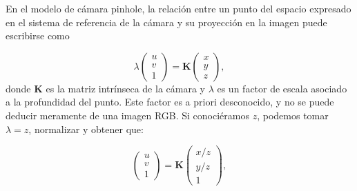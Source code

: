 En el modelo de cámara pinhole, la relación entre un punto del espacio expresado en el sistema de referencia de la cámara y su proyección en la imagen puede escribirse como

\begin{equation}
\lambda
\begin{pmatrix}
u \\
v \\
1
\end{pmatrix}
=
\mathbf{K}
\begin{pmatrix}
x \\
y \\
z
\end{pmatrix},
\end{equation}
donde $\mathbf{K}$ es la matriz intrínseca de la cámara y $\lambda$ es un factor de escala asociado a la profundidad del punto. Este factor es a priori desconocido, y no se puede deducir meramente de una imagen RGB. Si conociéramos $z$, podemos tomar $\lambda = z$, normalizar y obtener que:

\begin{equation}
\begin{pmatrix}
u \\
v \\
1
\end{pmatrix}
=
\mathbf{K}
\begin{pmatrix}
x/z \\
y/z \\
1
\end{pmatrix},
\end{equation}

